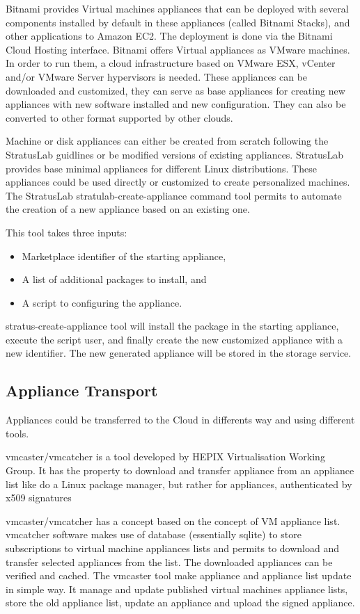 Bitnami provides Virtual machines appliances that can be deployed with several components installed by default in these appliances (called Bitnami Stacks), and other applications to Amazon EC2. The deployment is done via the Bitnami Cloud Hosting interface. Bitnami offers Virtual appliances as VMware machines. In order to run them, a cloud infrastructure based on VMware ESX, vCenter and/or VMware Server hypervisors is needed. These appliances can be downloaded and customized,  they can serve as base appliances for creating new appliances with new software installed and new configuration. They can also be converted to other format supported by other clouds.

Machine or disk appliances can either be created from scratch following the StratusLab guidlines or be modified versions of existing appliances. 
StratusLab provides base minimal appliances for different Linux distributions. These appliances could be used directly or customized to create personalized machines.
The StratusLab stratulab-create-appliance command tool permits to automate the creation of a new appliance based on an existing one.
 
This tool takes three inputs:
\begin{itemize}
\item Marketplace identifier of the starting appliance,
\item A list of additional packages to install, and
\item A script to configuring the appliance.
\end{itemize}
stratus-create-appliance tool will install the package in the starting appliance, execute the script user, and finally create the new customized appliance with a new identifier.
The new generated appliance will be stored in the storage service.

\subsection{Appliance Transport}
Appliances could be transferred to the Cloud in differents way and using different tools.

vmcaster/vmcatcher is a tool developed by HEPIX Virtualisation Working Group. It has the property to download and transfer appliance from an appliance list like do a Linux package manager, but rather for appliances, authenticated by x509 signatures

vmcaster/vmcatcher has a concept based on the concept of VM appliance list.
vmcatcher software makes use of database (essentially sqlite) to store subscriptions to virtual machine appliances lists and permits to download and transfer selected appliances from the list. The downloaded appliances can be verified and cached. 
The vmcaster tool make appliance and appliance list update in simple way. It manage and update published virtual machines appliance lists, store the old appliance list, update an appliance and upload the signed appliance.

